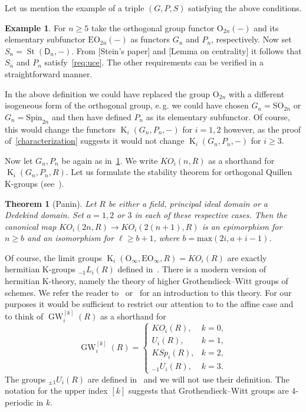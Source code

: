 \documentclass[oneside, 8pt]{amsart}
\newtheorem{theorem}{Theorem}
\theoremstyle{remark}
\theoremstyle{definition}
\newtheorem{example}[lemma]{Example} \Crefname{example}{Example}{Examples}
\DeclareMathOperator{\St}{St}
\DeclareMathOperator{\K}{K}
\DeclareMathOperator{\GW}{GW}
\newcommand{\rD}{\mathsf{D}}
\numberwithin{equation}{section}
\begin{document}
Let us mention the example of a triple $(G,P,S)$ satisfying the above conditions.
\begin{example} \label{ex:orth}
 For $n \geq 5$ take the orthogonal group functor $\mathrm{O}_{2n}(-)$ and its elementary subfunctor $\mathrm{EO}_{2n}(-)$ as functors $G_n$ and $P_n$, respectively.
 Now set $S_n = \St(\rD_n, -)$.
 From [Stein's paper] and [Lemma on centrality] it follows that $S_n$ and $P_n$ satisfy~\eqref{req:uce}.
 The other requirements can be verified in a straightforward manner.
\end{example}

In the above definition we could have replaced the group $\mathrm{O}_{2n}$ with a different isogeneous form of the orthogonal group, e.\,g. 
 we could have chosen $G_n = \mathrm{SO}_{2n}$ or $G_n = \mathrm{Spin}_{2n}$ and then have defined $P_n$ as its elementary subfunctor.
Of course, this would change the functors $\K_i(G_n, P_n, -)$ for $i=1,2$ however, as the proof of~\cref{characterization} suggests %
 it would not change $\K_i(G_n, P_n, -)$ for $i\geq 3$.

Now let $G_n, P_n$ be again as in~\cref{ex:orth}. We write $KO_i(n, R)$ as a shorthand for $\K_i(G_n, P_n, R)$.
Let us formulate the stability theorem for orthogonal Quillen K-groups (see~\cite[Theorem~9.4]{Pa89}).
\begin{theorem}[Panin] \label{lem:Panin-stability}
 Let $R$ be either a field, principal ideal domain or a Dedekind domain. Set $a = 1,2$ or $3$ in each of these respective cases.
 Then the canonical map $KO_i(2n, R) \to KO_i(2(n+1), R)$ is an epimorphism for $n \geq b$ 
 and an isomorphism for $\ell \geq b + 1$, where $b = \mathrm{max}(2i, a+i-1)$. \end{theorem}
 
Of course, the limit groups $\K_i(\mathrm{O}_\infty, \mathrm{EO}_\infty, R) = KO_i(R)$ are exactly hermitian K-groups ${}_{-1}\!L_i(R)$ defined in~\cite{Ka80}.
There is a modern version of hermitian K-theory, namely the theory of higher Grothendieck--Witt groups of schemes.
We refer the reader to~\cite[\S~2]{AF17} or~\cite[\S~2]{FRS12} for an introduction to this theory.
For our purposes it would be sufficient to restrict our attention to to the affine case and to think of $\GW_i^{[k]}(R)$ as a shorthand for
\begin{equation}
 \GW_i^{[k]}(R) = \left\{\begin{array}{ll} KO_i(R), & k = 0, \\ U_i(R), & k = 1, \\ KSp_i(R), & k = 2, \\ {}_{-1}\!U_i(R), & k = 3. \end{array}\right.
\end{equation} %
The groups ${}_{\pm 1}\!U_i(R)$ are defined in~\cite{Ka80} and we will not use their definition.
The notation for the upper index $[k]$ suggests that Grothendieck--Witt groups are $4$-periodic in $k$.
\end{document}
